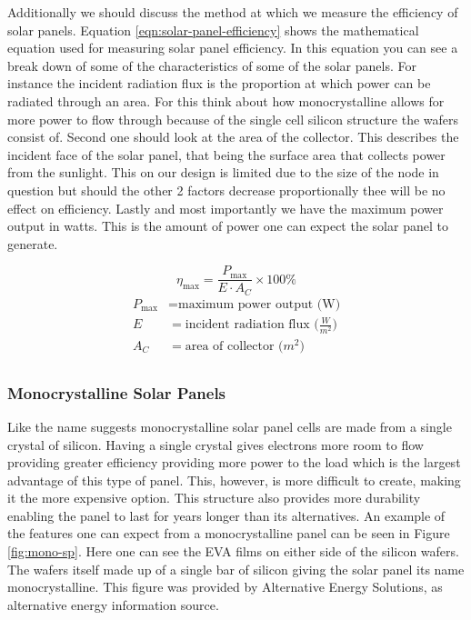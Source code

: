 Additionally we should discuss the method at which we measure the efficiency of solar panels. 
Equation \ref{eqn:solar-panel-efficiency} shows the mathematical equation used for measuring solar panel efficiency. In this equation you can see a break down of some of the characteristics of some of the solar panels. For instance the incident radiation flux is the proportion at which power can be radiated through an area. For this think about how monocrystalline allows for more power to flow through because of the single cell silicon structure the wafers consist of. Second one should look at the area of the collector. This describes the incident face of the solar panel, that being the surface area that collects power from the sunlight. This on our design is limited due to the size of the node in question but should the other 2 factors decrease proportionally thee will be no effect on efficiency. Lastly and most importantly we have the maximum power output in watts. This is the amount of power one can expect the solar panel to generate. 

\begin{equation}
\label{eqn:solar-panel-efficiency}
    \eta_{\text{max}} = \frac{P_{\text{max}}}{E\cdot A_C} \times 100\%
\end{equation}
\begin{align*}
    P_{\text{max}} &= \text{maximum power output (W)} \\
    E &= \text{incident radiation flux ($\frac{W}{m^2}$)} \\
    A_C &= \text{area of collector ($m^2$)} \\
\end{align*}


\subsubsection{Monocrystalline Solar Panels}

Like the name suggests monocrystalline solar panel cells are made from a single crystal of silicon. Having a single crystal gives electrons more room to flow providing greater efficiency providing more power to the load which is the largest advantage of this type of panel. This, however, is more difficult to create, making it the more expensive option. This structure also provides more durability enabling the panel to last for years longer than its alternatives. An example of the features one can expect from a monocrystalline panel can be seen in Figure \ref{fig:mono-sp}. Here one can see the EVA films on either side of the silicon wafers. The wafers itself made up of a single bar of silicon giving the solar panel its name monocrystalline. This figure was provided by Alternative Energy Solutions, as alternative energy information source.

